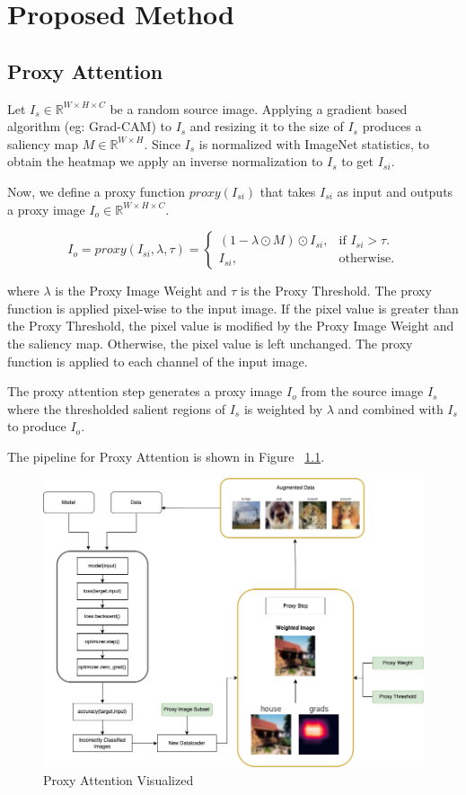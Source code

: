 \documentclass[a4paper,11pt,openright]{book}
\begin{document}
\chapter{Proposed Method} \label{ch:implementation}
\section{Proxy Attention}
Let $I_{s} \in \mathbb{R}^{W \times H \times C}$ be a random source image. 
Applying a gradient based algorithm (eg: Grad-CAM) to $I_{s}$ and resizing it to the size of $I_{s}$ produces a saliency map $M \in \mathbb{R}^{W \times H}$. 
Since $I_{s}$ is normalized with ImageNet statistics, to obtain the heatmap we apply an inverse normalization to $I_{s}$ to get $I_{si}$.

Now, we define a proxy function $proxy(I_{si})$ that takes $I_{si}$ as input and outputs a proxy image $I_{o} \in \mathbb{R}^{W \times H \times C}$.

\begin{equation}
    I_{o} = proxy(I_{si}, \lambda, \tau)=\begin{cases}
        (1- \lambda \odot M) \odot I_{si}, & \text{if $I_{si}> \tau$}.\\
        I_{si}, & \text{otherwise}.
    \end{cases}
\end{equation}

where $\lambda$ is the Proxy Image Weight and $\tau$ is the Proxy Threshold. The proxy function is applied pixel-wise to the input image. If the pixel value is greater than the Proxy Threshold, the pixel value is modified by the Proxy Image Weight and the saliency map. Otherwise, the pixel value is left unchanged. The proxy function is applied to each channel of the input image. 

The proxy attention step generates a proxy image $I_{o}$ from the source image $I_{s}$ where the thresholded salient regions of $I_{s}$ is weighted by $\lambda$ and combined with $I_{s}$ to produce $I_{o}$.

The pipeline for Proxy Attention is shown in Figure ~\ref{fig:proxy_flow}.

\begin{figure}[!htb]
    \centering
    \includegraphics[width=.8\textwidth]{images/proxy_flow.png}
    \caption{Proxy Attention Visualized}
    \label{fig:proxy_flow}
\end{figure}
\end{document}
